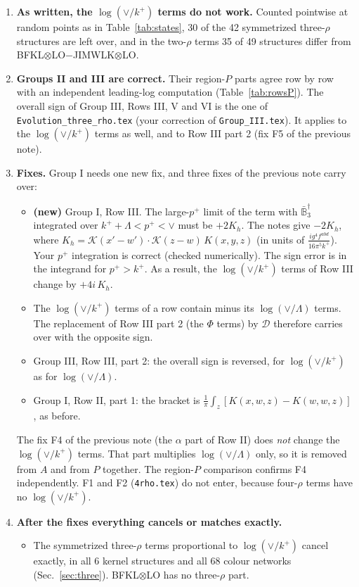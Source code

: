 \documentclass[10pt]{article}
\numberwithin{equation}{section}
\newcommand{\KK}{\mathcal K}
\newcommand{\kp}{k^+}
\newcommand{\pp}{p^+}
\begin{document}
\begin{enumerate}
\item \textbf{As written, the $\log(\vee/k^+)$ terms do not work.} Counted pointwise at random points as in Table~\ref{tab:states}, 30 of the 42 symmetrized three-$\rho$ structures are left over, and in the two-$\rho$ terms 35 of 49 structures differ from BFKL$\otimes$LO$-$JIMWLK$\otimes$LO.
\item \textbf{Groups II and III are correct.} Their region-$P$ parts agree row by row with an independent leading-log computation (Table~\ref{tab:rowsP}). The overall sign of Group III, Rows III, V and VI is the one of \texttt{Evolution\_three\_rho.tex} (your correction of \texttt{Group\_III.tex}). It applies to the $\log(\vee/k^+)$ terms as well, and to Row III part 2 (fix F5 of the previous note).
\item \textbf{Fixes.} Group I needs one new fix, and three fixes of the previous note carry over:
\begin{itemize}
\item[P1] \textbf{(new)} Group I, Row III. The large-$\pp$ limit of the term with $\bar{\mathbb B}_3^\dagger$ integrated over $\kp+\Lambda<\pp<\vee$ must be $+2K_h$. The notes give $-2K_h$, where $K_h=\KK(x'-w')\cdot\KK(z-w)\,K(x,y,z)$ (in units of $\frac{ig^4f^{abd}}{16\pi^5k^+}$). Your $\pp$ integration is correct (checked numerically). The sign error is in the integrand for $\pp>\kp$. As a result, the $\log(\vee/k^+)$ terms of Row III change by $+4i\,K_h$.
\item[F3] The $\log(\vee/k^+)$ terms of a row contain minus its $\log(\vee/\Lambda)$ terms. The replacement of Row III part 2 (the $\Phi$ terms) by $\mathcal D$ therefore carries over with the opposite sign.
\item[F5] Group III, Row III, part 2: the overall sign is reversed, for $\log(\vee/k^+)$ as for $\log(\vee/\Lambda)$.
\item[F6] Group I, Row II, part 1: the bracket is $\frac1\pi\int_z[K(x,w,z)-K(w,w,z)]$, as before.
\end{itemize}
The fix F4 of the previous note (the $\alpha$ part of Row II) does \emph{not} change the $\log(\vee/k^+)$ terms. That part multiplies $\log(\vee/\Lambda)$ only, so it is removed from $A$ and from $P$ together. The region-$P$ comparison confirms F4 independently. F1 and F2 (\texttt{4rho.tex}) do not enter, because four-$\rho$ terms have no $\log(\vee/k^+)$.
\item \textbf{After the fixes everything cancels or matches exactly.}
\begin{itemize}
\item The symmetrized three-$\rho$ terms proportional to $\log(\vee/k^+)$ cancel exactly, in all 6 kernel structures and all 68 colour networks (Sec.~\ref{sec:three}). BFKL$\otimes$LO has no three-$\rho$ part.

\end{itemize}
\end{enumerate}
\end{document}
